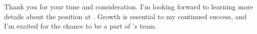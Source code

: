 



Thank you for your time and consideration. I'm looking forward to learning more details about the \position\;position at \company. Growth is essential to my continued success, and I'm excited for the chance to be a part of \company's team.


